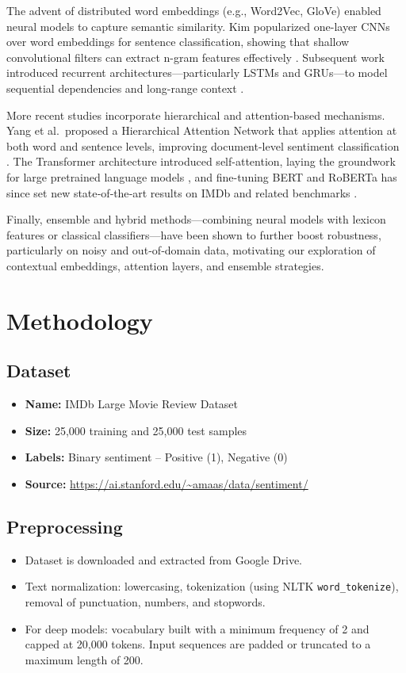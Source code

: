\documentclass[12pt,a4paper]{article}
\begin{document}
The advent of distributed word embeddings (e.g., Word2Vec, GloVe) enabled neural models to capture semantic similarity. Kim popularized one-layer CNNs over word embeddings for sentence classification, showing that shallow convolutional filters can extract n-gram features effectively \cite{Kim2014}. Subsequent work introduced recurrent architectures—particularly LSTMs and GRUs—to model sequential dependencies and long-range context \cite{Tang2015}.

More recent studies incorporate hierarchical and attention-based mechanisms. Yang et al.\ proposed a Hierarchical Attention Network that applies attention at both word and sentence levels, improving document-level sentiment classification \cite{Yang2016}. The Transformer architecture introduced self-attention, laying the groundwork for large pretrained language models \cite{Vaswani2017}, and fine-tuning BERT and RoBERTa has since set new state‐of‐the‐art results on IMDb and related benchmarks \cite{Devlin2019, Liu2019}.

Finally, ensemble and hybrid methods—combining neural models with lexicon features or classical classifiers—have been shown to further boost robustness, particularly on noisy and out‐of‐domain data, motivating our exploration of contextual embeddings, attention layers, and ensemble strategies.

\section{Methodology}
\subsection{Dataset}
\begin{itemize}
  \item \textbf{Name:} IMDb Large Movie Review Dataset
  \item \textbf{Size:} 25,000 training and 25,000 test samples
  \item \textbf{Labels:} Binary sentiment – Positive (1), Negative (0)
  \item \textbf{Source:} \url{https://ai.stanford.edu/~amaas/data/sentiment/}
\end{itemize}

\subsection{Preprocessing}
\begin{itemize}
  \item Dataset is downloaded and extracted from Google Drive.
  \item Text normalization: lowercasing, tokenization (using NLTK \texttt{word\_tokenize}), removal of punctuation, numbers, and stopwords.
  \item For deep models: vocabulary built with a minimum frequency of 2 and capped at 20,000 tokens. Input sequences are padded or truncated to a maximum length of 200.
\end{itemize}
\end{document}

